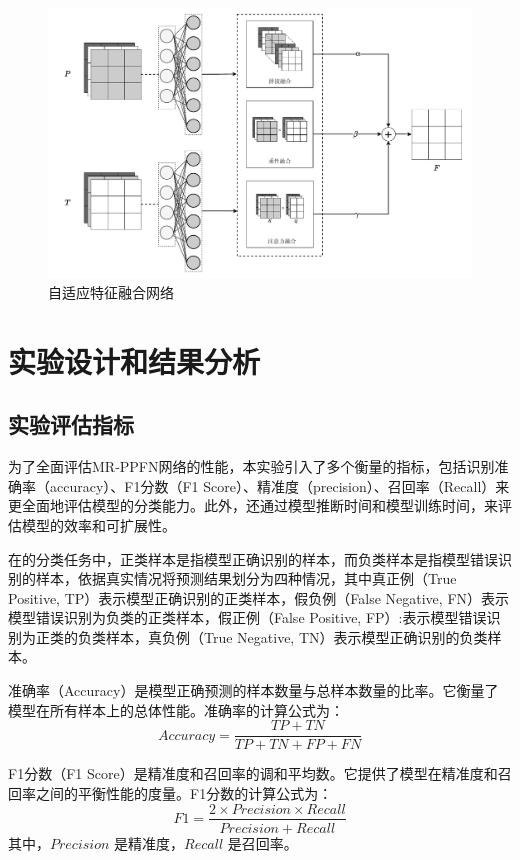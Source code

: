 \begin{figure}[htbp] 
    \centering
    \includegraphics[width=0.8\linewidth]{imgs/Adaptive Fusion NetWork.pdf}
    \caption{自适应特征融合网络}
    \label{fig:Adaptive Fusion NetWork}
\end{figure} 


\section{实验设计和结果分析}
\subsection{实验评估指标}
为了全面评估MR-PPFN网络的性能，本实验引入了多个衡量的指标，包括识别准确率（accuracy）、F1分数（F1 Score）、精准度（precision）、召回率（Recall）来更全面地评估模型的分类能力。此外，还通过模型推断时间和模型训练时间，来评估模型的效率和可扩展性。
 
在的分类任务中，正类样本是指模型正确识别的样本，而负类样本是指模型错误识别的样本，依据真实情况将预测结果划分为四种情况，其中真正例（True Positive, TP）表示模型正确识别的正类样本，假负例（False Negative, FN）表示模型错误识别为负类的正类样本，假正例（False Positive, FP）:表示模型错误识别为正类的负类样本，真负例（True Negative, TN）表示模型正确识别的负类样本。

准确率（Accuracy）是模型正确预测的样本数量与总样本数量的比率。它衡量了模型在所有样本上的总体性能。准确率的计算公式为：
\begin{equation}
    \label{eq:accuracy}
    Accuracy = \frac{TP + TN}{TP + TN + FP + FN}
\end{equation}

F1分数（F1 Score）是精准度和召回率的调和平均数。它提供了模型在精准度和召回率之间的平衡性能的度量。F1分数的计算公式为：
\begin{equation}
    \label{eq:f1}
    F1 = \frac{2 \times Precision \times Recall}{Precision + Recall}
\end{equation}
其中，$Precision$ 是精准度，$Recall$ 是召回率。

